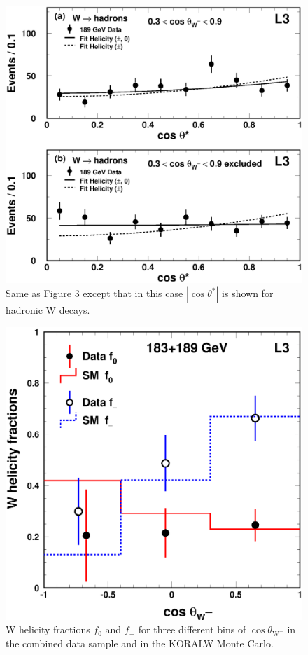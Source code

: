 \documentclass[12pt,a4paper,dvips]{article}
\newlength{\figwidth}
\begin{document}
\newpage
\begin{figure}[htbp]
  \begin{center}
    \includegraphics[width=\figwidth]{wwlongfig4.eps}
  \end{center}
  \caption{Same as Figure 3 except that in this case 
$|\cos \theta^{*}|$ is shown for hadronic W decays.
} 
\label{fig:wwpol4}
\end{figure}
\newpage
\begin{figure}[htbp]
  \begin{center}
    \includegraphics[width=\figwidth]{wwlongfig5.eps}
  \end{center}
  \caption{W helicity fractions $f_{0}$ and $f_{-}$ 
for three different bins of $\cos \theta_{\mathrm{W}^{-}}$
in the combined data sample and in the KORALW Monte Carlo.  
} 
\label{fig:wwpol5}
\end{figure}



%
%
\end{document}
